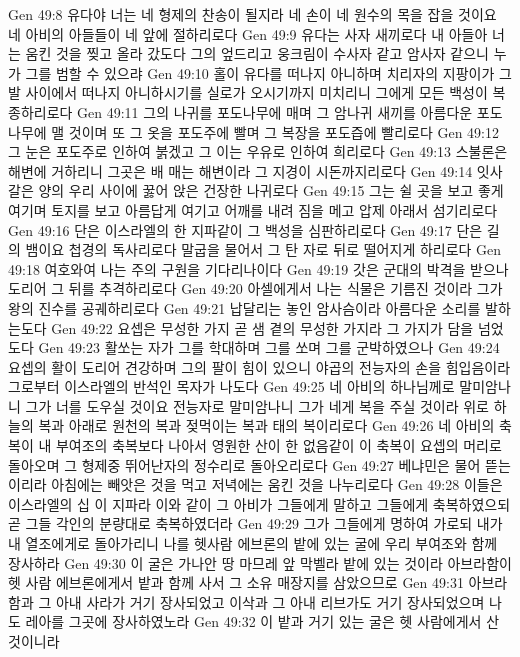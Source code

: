 Gen 49:8  유다야 너는 네 형제의 찬송이 될지라 네 손이 네 원수의 목을 잡을 것이요 네 아비의 아들들이 네 앞에 절하리로다
Gen 49:9  유다는 사자 새끼로다 내 아들아 너는 움킨 것을 찢고 올라 갔도다 그의 엎드리고 웅크림이 수사자 같고 암사자 같으니 누가 그를 범할 수 있으랴
Gen 49:10  홀이 유다를 떠나지 아니하며 치리자의 지팡이가 그 발 사이에서 떠나지 아니하시기를 실로가 오시기까지 미치리니 그에게 모든 백성이 복종하리로다
Gen 49:11  그의 나귀를 포도나무에 매며 그 암나귀 새끼를 아름다운 포도나무에 맬 것이며 또 그 옷을 포도주에 빨며 그 복장을 포도즙에 빨리로다
Gen 49:12  그 눈은 포도주로 인하여 붉겠고 그 이는 우유로 인하여 희리로다
Gen 49:13  스불론은 해변에 거하리니 그곳은 배 매는 해변이라 그 지경이 시돈까지리로다
Gen 49:14  잇사갈은 양의 우리 사이에 꿇어 앉은 건장한 나귀로다
Gen 49:15  그는 쉴 곳을 보고 좋게 여기며 토지를 보고 아름답게 여기고 어깨를 내려 짐을 메고 압제 아래서 섬기리로다
Gen 49:16  단은 이스라엘의 한 지파같이 그 백성을 심판하리로다
Gen 49:17  단은 길의 뱀이요 첩경의 독사리로다 말굽을 물어서 그 탄 자로 뒤로 떨어지게 하리로다
Gen 49:18  여호와여 나는 주의 구원을 기다리나이다
Gen 49:19  갓은 군대의 박격을 받으나 도리어 그 뒤를 추격하리로다
Gen 49:20  아셀에게서 나는 식물은 기름진 것이라 그가 왕의 진수를 공궤하리로다
Gen 49:21  납달리는 놓인 암사슴이라 아름다운 소리를 발하는도다
Gen 49:22  요셉은 무성한 가지 곧 샘 곁의 무성한 가지라 그 가지가 담을 넘었도다
Gen 49:23  활쏘는 자가 그를 학대하며 그를 쏘며 그를 군박하였으나
Gen 49:24  요셉의 활이 도리어 견강하며 그의 팔이 힘이 있으니 야곱의 전능자의 손을 힘입음이라 그로부터 이스라엘의 반석인 목자가 나도다
Gen 49:25  네 아비의 하나님께로 말미암나니 그가 너를 도우실 것이요 전능자로 말미암나니 그가 네게 복을 주실 것이라 위로 하늘의 복과 아래로 원천의 복과 젖먹이는 복과 태의 복이리로다
Gen 49:26  네 아비의 축복이 내 부여조의 축복보다 나아서 영원한 산이 한 없음같이 이 축복이 요셉의 머리로 돌아오며 그 형제중 뛰어난자의 정수리로 돌아오리로다
Gen 49:27  베냐민은 물어 뜯는 이리라 아침에는 빼앗은 것을 먹고 저녁에는 움킨 것을 나누리로다
Gen 49:28  이들은 이스라엘의 십 이 지파라 이와 같이 그 아비가 그들에게 말하고 그들에게 축복하였으되 곧 그들 각인의 분량대로 축복하였더라
Gen 49:29  그가 그들에게 명하여 가로되 내가 내 열조에게로 돌아가리니 나를 헷사람 에브론의 밭에 있는 굴에 우리 부여조와 함께 장사하라
Gen 49:30  이 굴은 가나안 땅 마므레 앞 막벨라 밭에 있는 것이라 아브라함이 헷 사람 에브론에게서 밭과 함께 사서 그 소유 매장지를 삼았으므로
Gen 49:31  아브라함과 그 아내 사라가 거기 장사되었고 이삭과 그 아내 리브가도 거기 장사되었으며 나도 레아를 그곳에 장사하였노라
Gen 49:32  이 밭과 거기 있는 굴은 헷 사람에게서 산 것이니라
